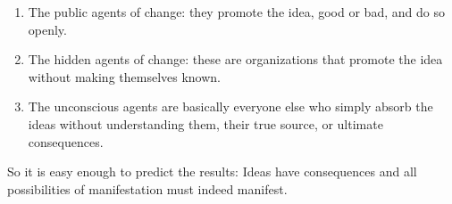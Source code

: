 \begin{footnotesize}
\begin{sffamily}
\begin{enumerate}
\item The public agents of change: they promote the idea, good or bad, and do so openly.

\item The hidden agents of change: these are organizations that promote the idea without making themselves known.

\item The unconscious agents are basically everyone else who simply absorb the ideas without understanding them, their true source, or ultimate consequences.
\end{enumerate}


So it is easy enough to predict the results: Ideas have consequences and all possibilities of manifestation must indeed manifest.

\hfill

\end{sffamily}
\end{footnotesize}

